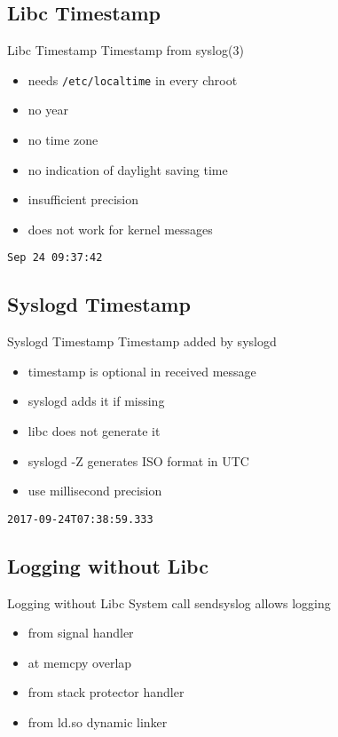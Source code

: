 \documentclass[14pt]{beamer}
\begin{document}
\subsection{Libc Timestamp}
\begin{frame}{Libc Timestamp}
    Timestamp from syslog(3)
\begin{itemize}
    \item needs \texttt{/etc/localtime} in every chroot
    \item no year
    \item no time zone
    \item no indication of daylight saving time
    \item insufficient precision
    \item does not work for kernel messages
\end{itemize}
    \vspace{.5cm}
    \texttt{Sep 24 09:37:42}
\end{frame}

\subsection{Syslogd Timestamp}
\begin{frame}{Syslogd Timestamp}
    Timestamp added by syslogd
\begin{itemize}
    \item timestamp is optional in received message
    \item syslogd adds it if missing
    \item libc does not generate it
    \item syslogd -Z generates ISO format in UTC
    \item use millisecond precision
\end{itemize}
    \vspace{.5cm}
    \texttt{2017-09-24T07:38:59.333}
\end{frame}

\subsection{Logging without Libc}
\begin{frame}{Logging without Libc}
    System call sendsyslog allows logging
\begin{itemize}
    \item from signal handler
    \item at memcpy overlap
    \item from stack protector handler
    \item from ld.so dynamic linker
\end{itemize}
\end{frame}
\end{document}
